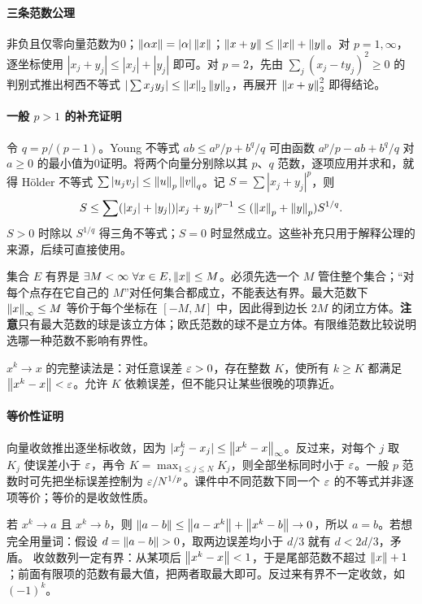 \paragraph{三条范数公理}非负且仅零向量范数为0；$\left\lVert\alpha x\right\rVert=|\alpha|\left\lVert x\right\rVert$；$\left\lVert x+y\right\rVert\le\left\lVert x\right\rVert+\left\lVert y\right\rVert$。对 $p=1,\infty$，逐坐标使用 $|x_j+y_j|\le|x_j|+|y_j|$ 即可。对 $p=2$，先由 $\sum_j(x_j-ty_j)^2\ge0$ 的判别式推出柯西不等式 $|\sum x_jy_j|\le\left\lVert x\right\rVert_2\left\lVert y\right\rVert_2$，再展开 $\left\lVert x+y\right\rVert_2^2$ 即得结论。
\paragraph{一般 $p>1$ 的补充证明}令 $q=p/(p-1)$。Young 不等式 $ab\le a^p/p+b^q/q$ 可由函数 $a^p/p-ab+b^q/q$ 对 $a\ge0$ 的最小值为0证明。将两个向量分别除以其 $p$、$q$ 范数，逐项应用并求和，就得 Hölder 不等式 $\sum|u_jv_j|\le\left\lVert u\right\rVert_p\left\lVert v\right\rVert_q$。记 $S=\sum|x_j+y_j|^p$，则
\[
 S\le\sum(|x_j|+|y_j|)|x_j+y_j|^{p-1}
 \le(\left\lVert x\right\rVert_p+\left\lVert y\right\rVert_p)S^{1/q}.
\]
$S>0$ 时除以 $S^{1/q}$ 得三角不等式；$S=0$ 时显然成立。这些补充只用于解释公理的来源，后续可直接使用。

集合 $E$ 有界是 $\exists M<\infty\ \forall x\in E,\left\lVert x\right\rVert\le M$。必须先选一个 $M$ 管住整个集合；``对每个点存在它自己的 $M$''对任何集合都成立，不能表达有界。最大范数下 $\left\lVert x\right\rVert_\infty\le M$ 等价于每个坐标在 $[-M,M]$ 中，因此得到边长 $2M$ 的闭立方体。\textbf{注意}只有最大范数的球是该立方体；欧氏范数的球不是立方体。有限维范数比较说明选哪一种范数不影响有界性。

$x^k\to x$ 的完整读法是：对任意误差 $\varepsilon>0$，存在整数 $K$，使所有 $k\ge K$ 都满足 $\left\lVert x^k-x\right\rVert<\varepsilon$。允许 $K$ 依赖误差，但不能只让某些很晚的项靠近。
\paragraph{等价性证明}向量收敛推出逐坐标收敛，因为 $|x^k_j-x_j|\le\left\lVert x^k-x\right\rVert_\infty$。反过来，对每个 $j$ 取 $K_j$ 使误差小于 $\varepsilon$，再令 $K=\max_{1\le j\le N}K_j$，则全部坐标同时小于 $\varepsilon$。一般 $p$ 范数时可先把坐标误差控制为 $\varepsilon/N^{1/p}$。课件中不同范数下同一个 $\varepsilon$ 的不等式并非逐项等价；等价的是收敛性质。

若 $x^k\to a$ 且 $x^k\to b$，则 $\left\lVert a-b\right\rVert\le\left\lVert a-x^k\right\rVert+\left\lVert x^k-b\right\rVert\to0$，所以 $a=b$。若想完全用量词：假设 $d=\left\lVert a-b\right\rVert>0$，取两边误差均小于 $d/3$ 就有 $d<2d/3$，矛盾。
收敛数列一定有界：从某项后 $\left\lVert x^k-x\right\rVert<1$，于是尾部范数不超过 $\left\lVert x\right\rVert+1$；前面有限项的范数有最大值，把两者取最大即可。反过来有界不一定收敛，如 $(-1)^k$。

